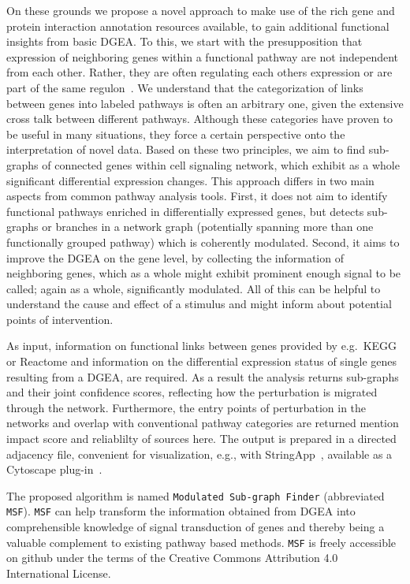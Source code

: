 \documentclass[10pt,a4paper,twocolumn]{article}
\newcommand{\FA}[1]{\begingroup\color{magenta}#1\endgroup}
\begin{document}
	On these grounds we propose a novel approach to make use of the rich gene
	and protein interaction annotation resources available, to gain additional
	functional insights from basic DGEA. To this, we start with the
	presupposition that expression of neighboring genes within a functional
	pathway are not independent from each other. Rather, they are often
	regulating each others expression or are part of the same
	regulon~\cite{Michalak}. We understand that the categorization of links
	between genes into labeled pathways is often an arbitrary one, given the
	extensive cross talk between different pathways. Although these categories
	have proven to be useful in many situations, they force a certain
	perspective onto the interpretation of novel data. Based on these two
	principles, we aim to find sub-graphs of connected genes within cell
	signaling network, which exhibit as a whole significant differential
	expression changes. This approach differs in two main aspects from common
	pathway analysis tools. First, it does not aim to identify functional
	pathways enriched in differentially expressed genes, but detects sub-graphs
	or branches in a network graph (potentially spanning more than one
	functionally grouped pathway) which is coherently modulated. Second, it
	aims to improve the DGEA on the gene level, by collecting the information
	of neighboring genes, which as a whole might exhibit prominent enough
	signal to be called; again as a whole, significantly modulated. All of this can be helpful to understand the cause and effect of a stimulus and might inform about potential points of intervention.
	
	As input, information on functional links between genes provided by
	e.g.~KEGG or Reactome and information on the differential expression status
	of single genes resulting from a DGEA, are required. As a result the
	analysis returns sub-graphs and their joint confidence scores, reflecting
	how the perturbation is migrated through the network. Furthermore, the
	entry points of perturbation in the networks and overlap with conventional
	pathway categories are returned \FA{mention impact score and reliablilty of sources here}. The output is prepared in a directed
	adjacency file, convenient for visualization, e.g., with
	StringApp~\cite{StringApp}, available as a Cytoscape plug-in~\cite{Cyto}.
	
	The proposed algorithm is named
	\texttt{Modulated Sub-graph Finder} (abbreviated
	\texttt{MSF}). \texttt{MSF} can help transform the information obtained
	from DGEA into comprehensible knowledge of signal transduction of genes and
	thereby being a valuable complement to existing pathway based
	methods.  \texttt{MSF} is freely accessible on github under the terms of the
	Creative Commons Attribution 4.0 International License.
	
\end{document}
